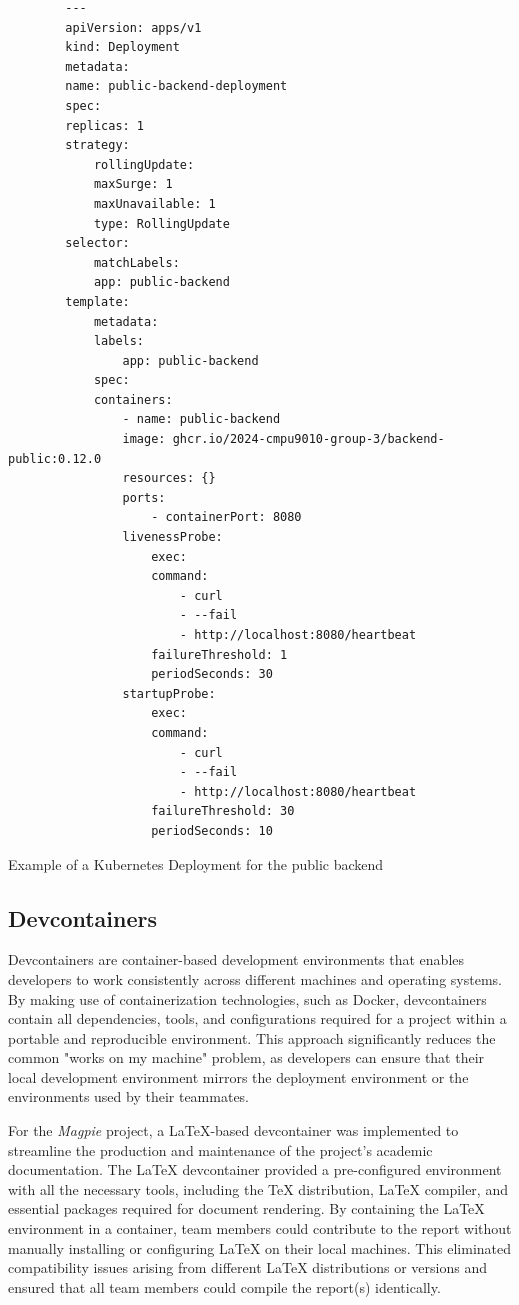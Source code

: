 \begin{listing}[htbp]
    \begin{verbatim}
        ---
        apiVersion: apps/v1
        kind: Deployment
        metadata:
        name: public-backend-deployment
        spec:
        replicas: 1
        strategy:
            rollingUpdate:
            maxSurge: 1
            maxUnavailable: 1
            type: RollingUpdate
        selector:
            matchLabels:
            app: public-backend
        template:
            metadata:
            labels:
                app: public-backend
            spec:
            containers:
                - name: public-backend
                image: ghcr.io/2024-cmpu9010-group-3/backend-public:0.12.0
                resources: {}
                ports:
                    - containerPort: 8080
                livenessProbe:
                    exec:
                    command:
                        - curl
                        - --fail
                        - http://localhost:8080/heartbeat
                    failureThreshold: 1
                    periodSeconds: 30
                startupProbe:
                    exec:
                    command:
                        - curl
                        - --fail
                        - http://localhost:8080/heartbeat
                    failureThreshold: 30
                    periodSeconds: 10
    \end{verbatim}
    \caption{Example of a Kubernetes Deployment for the public backend}
\end{listing}

\subsection{Devcontainers}
Devcontainers are container-based development environments that enables
developers to work consistently across different machines and operating systems.
By making use of containerization technologies, such as Docker, devcontainers
contain all dependencies, tools, and configurations required for a project
within a portable and reproducible environment. This approach significantly
reduces the common "works on my machine" problem, as developers can ensure that
their local development environment mirrors the deployment environment or the
environments used by their teammates.

For the \textit{Magpie} project, a LaTeX-based devcontainer was implemented to
streamline the production and maintenance of the project's academic
documentation. The LaTeX devcontainer provided a pre-configured environment with
all the necessary tools, including the TeX distribution, LaTeX compiler, and
essential packages required for document rendering. By containing the LaTeX
environment in a container, team members could contribute to the report without
manually installing or configuring LaTeX on their local machines. This
eliminated compatibility issues arising from different LaTeX distributions or
versions and ensured that all team members could compile the report(s)
identically.

